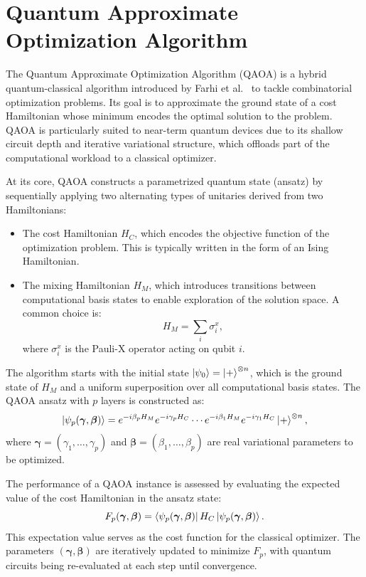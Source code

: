 \section{Quantum Approximate Optimization Algorithm}
\label{Section:QAOA}

The Quantum Approximate Optimization Algorithm (QAOA) is a hybrid quantum-classical algorithm
introduced by Farhi et al.~\cite{farhi_quantum_2014} to tackle combinatorial optimization problems.
Its goal is to approximate the ground state of a cost Hamiltonian whose minimum encodes the
optimal solution to the problem. QAOA is particularly suited to near-term quantum devices
due to its shallow circuit depth and iterative variational structure, which offloads part
of the computational workload to a classical optimizer.

At its core, QAOA constructs a parametrized quantum state (ansatz) by sequentially applying
two alternating types of unitaries derived from two Hamiltonians:
\begin{itemize}
    \item The cost Hamiltonian $H_C$, which encodes the objective function of the optimization
    problem. This is typically written in the form of an Ising Hamiltonian.
    \item The mixing Hamiltonian $H_M$, which introduces transitions between computational
    basis states to enable exploration of the solution space. A common choice is:
    \begin{equation}
        H_M = \sum_i \sigma_i^x,
        \label{eq:mixing_hamiltonian}
    \end{equation}
    where $\sigma_i^x$ is the Pauli-X operator acting on qubit $i$.
\end{itemize}

The algorithm starts with the initial state $\ket{\psi_0} = \ket{+}^{\otimes n}$, which is
the ground state of $H_M$ and a uniform superposition over all computational basis states.
The QAOA ansatz with $p$ layers is constructed as:
\begin{equation}
    \ket{\psi_p(\bm{\gamma}, \bm{\beta})} = e^{-i \beta_p H_M} e^{- i \gamma_p H_C} \cdots
    e^{-i \beta_1 H_M} e^{- i \gamma_1 H_C} \ket{+}^{\otimes n},
    \label{eq:qaoa_state_evolution}
\end{equation}
where $\bm{\gamma} = (\gamma_1, \dots, \gamma_p)$ and $\bm{\beta} = (\beta_1, \dots, \beta_p)$
are real variational parameters to be optimized.

The performance of a QAOA instance is assessed by evaluating the expected value of the cost
Hamiltonian in the ansatz state:
\begin{equation}
    F_p (\bm{\gamma}, \bm{\beta}) = \bra{\psi_p (\bm{\gamma}, \bm{\beta})} H_C \ket{\psi_p (\bm{\gamma}, \bm{\beta})}.
    \label{eq:cost_function}
\end{equation}
This expectation value serves as the cost function for the classical optimizer. The parameters $(\bm{\gamma}, \bm{\beta})$ are iteratively updated to minimize $F_p$, with quantum circuits being re-evaluated at each step until convergence.

